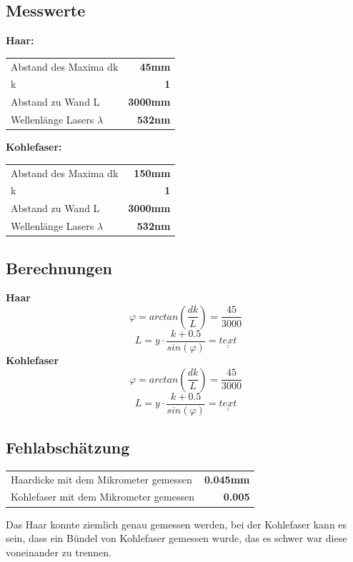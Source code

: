\documentclass{article}
\begin{document}
\subsection{Messwerte}

\textbf{Haar:}

\begin{tabular}{l r}
	Abstand des Maxima dk & \textbf{45mm}\\
	k	&\textbf{1}\\
	Abstand zu Wand L&\textbf{3000mm} \\
	Wellenlänge Lasers $\lambda$ & \textbf{532nm}
\end{tabular}

\textbf{Kohlefaser:}

\begin{tabular}{l r}
	Abstand des Maxima dk & \textbf{150mm}\\
	k	&\textbf{1}\\
	Abstand zu Wand L&\textbf{3000mm}\\
	Wellenlänge Lasers $\lambda$ & \textbf{532nm}
\end{tabular}

\subsection{Berechnungen}
\textbf{Haar}
\begin{equation}
\varphi = arctan(\frac{dk}{L}) = \frac{45}{3000}
\end{equation}
\begin{equation}
L = y \cdot \frac{k+0.5}{sin(\varphi)}= \underline{\underline{text}} 
\end{equation}
\textbf{Kohlefaser}
\begin{equation}
\varphi = arctan(\frac{dk}{L}) = \frac{45}{3000}
\end{equation}
\begin{equation}
L = y \cdot \frac{k+0.5}{sin(\varphi)}= \underline{\underline{text}} 
\end{equation}
\subsection{Fehlabschätzung}
\begin{tabular}{l r}
	Haardicke mit dem Mikrometer gemessen & \textbf{0.045mm}\\
	Kohlefaser mit dem Mikrometer gemessen	&\textbf{0.005}\\
\end{tabular}
Das Haar konnte ziemlich genau gemessen werden, bei der Kohlefaser kann es sein, dass ein Bündel
von Kohlefaser gemessen wurde, das es schwer war diese voneinander zu trennen.
\end{document}
